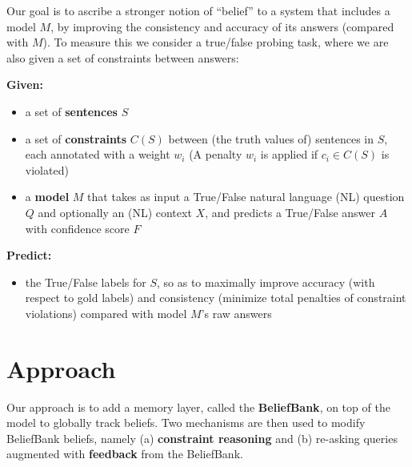 \documentclass[11pt]{article}
\newcommand{\red}[1]{\textcolor{red}{#1}}
\newenvironment{myquote}{                   %
  \parskip 0mm \begin{quoting}[vskip=0mm,leftmargin=2mm]}{
\end{quoting}}
\newenvironment{ite}{                     %
     \parskip 0cm \begin{itemize} \parskip 0cm \parsep 0cm \itemsep 0cm \topsep 0cm}{
        \end{itemize}} %
\begin{document}
Our goal is to ascribe a stronger notion of ``belief'' to a system that includes a model $M$,
by improving the consistency and accuracy of its answers (compared with $M$). To measure
this we consider a true/false probing task, where we are also given a set of
constraints between answers:
\begin{myquote}
{\bf Given:}
\begin{ite}
\item a set of {\bf sentences} $S$ 
\item a set of {\bf constraints} $C(S)$ between (the truth values of) sentences in $S$, each annotated with a weight $w_i$ (A penalty $w_i$ is applied if $c_i \in C(S)$ is violated)
\item a {\bf model} $M$ that takes as input a True/False natural language (NL) question $Q$ and optionally an (NL) context $X$, and predicts a True/False answer $A$ with confidence score $F$
\end{ite}
{\bf Predict:}
\begin{ite}
\item the True/False labels for $S$, so as to maximally improve accuracy (with respect to gold labels) and
   consistency (minimize total penalties of constraint violations) compared with model $M$'s raw answers
\end{ite}
\end{myquote}



\section{Approach}

Our approach is to add a
memory layer, called the {\bf BeliefBank}, on top of the model to globally 
track beliefs. Two mechanisms are then used to modify BeliefBank beliefs, namely
(a) {\bf constraint reasoning} and (b) re-asking queries augmented with {\bf feedback} from the BeliefBank.
\end{document}
